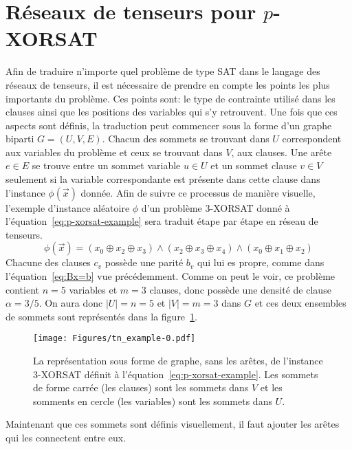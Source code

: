 \section{Réseaux de tenseurs pour \texorpdfstring{$p$}{p}-XORSAT}\label{sec:tn-for-p-xorsat}
Afin de traduire n'importe quel problème de type SAT dans le langage des réseaux de tenseurs, il est nécessaire de prendre en compte les points les plus importants du problème.
Ces points sont: le type de contrainte utilisé dans les clauses ainsi que les positions des variables qui s'y retrouvent.
Une fois que ces aspects sont définis, la traduction peut commencer sous la forme d'un graphe biparti $G = (U, V, E)$.
Chacun des sommets se trouvant dans $U$ correspondent aux variables du problème et ceux se trouvant dans $V$, aux clauses.
Une arête $e \in E$ se trouve entre un sommet variable $u \in U$ et un sommet clause $v \in V$ seulement si la variable correspondante est présente dans cette clause dans l'instance $\phi(\vec{x})$ donnée.
Afin de suivre ce processus de manière visuelle, l'exemple d'instance aléatoire $\phi$ d'un problème $3$-XORSAT donné à l'équation~\ref{eq:p-xorsat-example} sera traduit étape par étape en réseau de tenseurs.
\begin{equation}\label{eq:p-xorsat-example}
    \phi(\vec{x}) = (x_0 \oplus x_2 \oplus x_3) \wedge (x_2 \oplus x_3 \oplus x_4) \wedge (x_0 \oplus x_1 \oplus x_2)
\end{equation}
Chacune des clauses $c_v$ possède une parité $b_v$ qui lui es propre, comme dans l'équation~\ref{eq:Bx=b} vue précédemment.
Comme on peut le voir, ce problème contient $n = 5$ variables et $m = 3$ clauses, donc possède une densité de clause $\alpha = 3/5$.
On aura donc $|U| = n = 5$ et $|V| = m = 3$ dans $G$ et ces deux ensembles de sommets sont représentés dans la figure~\ref{fig:tn-example0}.
\begin{figure}[h]
    \centering
    \texttt{[image: Figures/tn\_example-0.pdf]}
    \caption{La représentation sous forme de graphe, sans les arêtes, de l'instance $3$-XORSAT définit à l'équation~\ref{eq:p-xorsat-example}. Les sommets de forme carrée (les clauses) sont les sommets dans $V$ et les somments en cercle (les variables) sont les sommets dans $U$.}
    \label{fig:tn-example0}
\end{figure}
Maintenant que ces sommets sont définis visuellement, il faut ajouter les arêtes qui les connectent entre eux.

